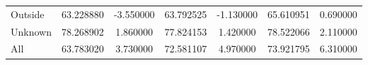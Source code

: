 \begin{table}[h!]
\begin{tabular}{lSSSSSS@{}}
        \tabindent Outside          & 63.228880                                        & -3.550000                                             & 63.792525                                     & -1.130000 & 65.610951    & 0.690000  \\
        \tabindent Unknown          & 78.268902                                        & 1.860000                                              & 77.824153                                     & 1.420000  & 78.522066    & 2.110000  \\
        \cmidrule(rl){1-7}
 All              & 63.783020                                        & 3.730000                                              & 72.581107                                     & 4.970000  & 73.921795    & 6.310000  \\
        \bottomrule
    \end{tabular}
\end{table}

